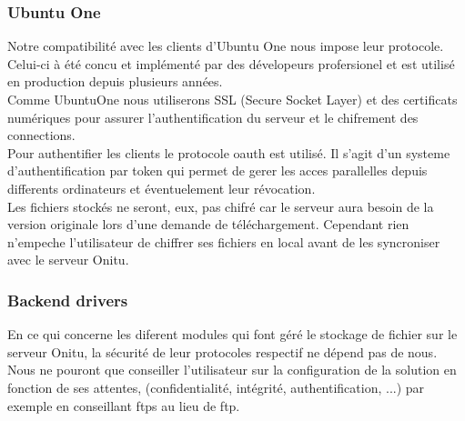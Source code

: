 \subsubsection{Ubuntu One}
Notre compatibilité avec les clients d'Ubuntu One nous impose leur protocole. Celui-ci à été concu et implémenté par des dévelopeurs profersionel et est utilisé en production depuis plusieurs années.\\
Comme UbuntuOne nous utiliserons SSL (Secure Socket Layer) et des certificats numériques pour assurer l'authentification du serveur et le chifrement des connections.\\
Pour authentifier les clients le protocole oauth est utilisé. Il s'agit d'un systeme d'authentification par token qui permet de gerer les acces parallelles depuis differents ordinateurs et éventuelement leur révocation.\\
Les fichiers stockés ne seront, eux, pas chifré car le serveur aura besoin de la version originale lors d'une demande de téléchargement. Cependant rien n'empeche l'utilisateur de chiffrer ses fichiers en local avant de les syncroniser avec le serveur Onitu.

\subsubsection{Backend drivers}
En ce qui concerne les diferent modules qui font géré le stockage de fichier sur le serveur Onitu, la sécurité de leur protocoles respectif ne dépend pas de nous. Nous ne pouront que conseiller l'utilisateur sur la configuration de la solution en fonction de ses attentes, (confidentialité, intégrité, authentification, ...) par exemple en conseillant ftps au lieu de ftp.
